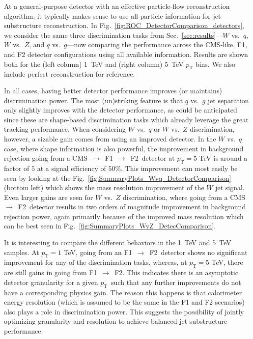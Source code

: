 \documentclass[11pt,letterpaper]{article}
\DeclareRobustCommand{\Sec}[1]{Sec.~\ref{#1}}
\DeclareRobustCommand{\Fig}[1]{Fig.~\ref{#1}}
\newcommand{\pt}{p_{\mathrm{T}}}
\begin{document}
At a general-purpose detector with an effective particle-flow reconstruction algorithm, it typically makes sense to use all particle information for jet substructure reconstruction.
%
In \Fig{fig:ROC_DetectorComparison_detectors}, we consider the same three discrimination tasks from \Sec{sec:results}---$W$ vs.~$q$, $W$ vs.~$Z$, and $q$ vs.~$g$---now comparing the performance across the CMS-like, F1, and F2 detector configurations using all available information.
%
Results are shown both for the (left column) 1~TeV and (right column) 5~TeV $\pt$ bins.
%
We also include perfect reconstruction for reference.

In all cases, having better detector performance improves (or maintains) discrimination power. 
%
The most (un)striking feature is that $q$ vs.~$g$ jet separation only slightly improves with the detector performance, as could be anticipated since these are shape-based discrimination tasks which already leverage the great tracking performance.
%
When considering $W$ vs.~$q$ or $W$ vs.~$Z$ discrimination, however, a sizable gain comes from using an improved detector.
%  
In the $W$ vs.~$q$ case, where shape information is also powerful, the improvement in background rejection going from a CMS~$\to$~F1~$\to$~F2~detector at $\pt = 5$ TeV is around a factor of $5$ at a signal efficiency of $50\%$.
This improvement can most easily be seen by looking at the Fig.~\ref{fig:SummaryPlots_Wvq_DetectorComparison} (bottom left) which shows the mass resolution improvement of the $W$ jet signal.
%
Even larger gains are seen for $W$ vs.~$Z$ discrimination, where going from a CMS~$\to$~F2~detector results in two orders of magnitude improvement in background rejection power, again primarily because of the improved mass resolution which can be best seen in Fig.~\ref{fig:SummaryPlots_WvZ_DetecComparison}.

It is interesting to compare the different behaviors in the 1~TeV and 5~TeV samples.
%
At $\pt = 1$ TeV, going from an F1~$\to$~F2~detector shows no significant improvement for any of the discrimination tasks, whereas, at $\pt = 5$ TeV, there are still gains in going from F1~$\to$~F2.
%
This indicates there is an asymptotic detector granularity for a given $\pt$~such that any further improvements do not have a corresponding physics gain.
%
The reason this happens is that calorimeter energy resolution (which is assumed to be the same in the F1 and F2 scenarios) also plays a role in discrimination power.
%
This suggests the possibility of jointly optimizing granularity and resolution to achieve balanced jet substructure performance.
\end{document}
